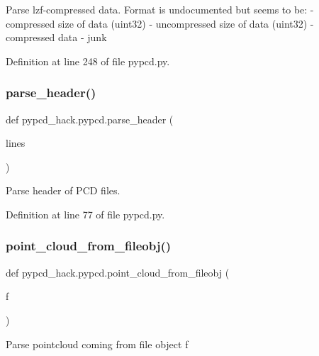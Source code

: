 \begin{DoxyVerb}Parse lzf-compressed data.
Format is undocumented but seems to be:
- compressed size of data (uint32)
- uncompressed size of data (uint32)
- compressed data
- junk
\end{DoxyVerb}
 

Definition at line 248 of file pypcd.\+py.

\mbox{\label{namespacepypcd__hack_1_1pypcd_ad763a73fac8704a3ac3d501258bbfc2f}} 
\subsubsection{\texorpdfstring{parse\+\_\+header()}{parse\_header()}}
{\footnotesize\ttfamily def pypcd\+\_\+hack.\+pypcd.\+parse\+\_\+header (\begin{DoxyParamCaption}\item[{}]{lines }\end{DoxyParamCaption})}

\begin{DoxyVerb}Parse header of PCD files.
\end{DoxyVerb}
 

Definition at line 77 of file pypcd.\+py.

\mbox{\label{namespacepypcd__hack_1_1pypcd_a082d05e46895d47fe7ce148f0b388ab5}} 
\subsubsection{\texorpdfstring{point\+\_\+cloud\+\_\+from\+\_\+fileobj()}{point\_cloud\_from\_fileobj()}}
{\footnotesize\ttfamily def pypcd\+\_\+hack.\+pypcd.\+point\+\_\+cloud\+\_\+from\+\_\+fileobj (\begin{DoxyParamCaption}\item[{}]{f }\end{DoxyParamCaption})}

\begin{DoxyVerb}Parse pointcloud coming from file object f
\end{DoxyVerb}
 

